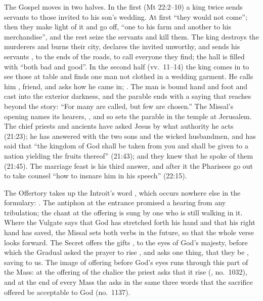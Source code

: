 The Gospel moves in two halves. In the first (Mt 22:2--10) a king twice sends
servants to those invited to his son's wedding. At first ``they would not
come''; then they make light of it and go off, ``one to his farm and another to his
merchandise'', and the rest seize the servants and kill them. The king destroys
the murderers and burns their city, declares the invited unworthy, and sends
his servants , to the ends of the roads, to
call everyone they find; the hall is filled with ``both bad and good''. In the
second half (vv.~11--14) the king comes in to see those at table and finds one
man not clothed in a wedding garment. He calls him , friend, and
asks how he came in; . The man is bound hand and foot
and cast into the exterior darkness, and the parable ends with a saying that
reaches beyond the story: ``For many are called, but few are chosen.'' The
Missal's opening names its hearers, , and so sets the parable in the temple at Jerusalem. The chief priests and ancients have
asked Jesus by what authority he acts (21:23); he has answered with the two sons
and the wicked husbandmen, and has said that ``the kingdom of God shall be taken
from you and shall be given to a nation yielding the fruits thereof'' (21:43);
and they knew that he spoke of them (21:45). The marriage feast is his third
answer, and after it the Pharisees go out to take counsel ``how to insnare him
in his speech'' (22:15).

The Offertory takes up the Introit's word , which occurs
nowhere else in the formulary: . The antiphon at the entrance promised a hearing from any
tribulation; the chant at the offering is sung by one who is still walking in
it. Where the Vulgate says that God has stretched forth his hand and that his
right hand has saved, the Missal sets both verbs in the future, so that the
whole verse looks forward. The Secret offers the gifts , to the eyes of God's majesty, before which the Gradual asked the
prayer to rise , and asks one thing, that they be
, saving to us. The image of offering before God's eyes
runs through this part of the Mass: at the offering of the chalice the priest
asks that it rise  (, no.~1032), and at the end of every Mass the
 asks in the same three words that the sacrifice offered
 be acceptable to God (no.~1137).

